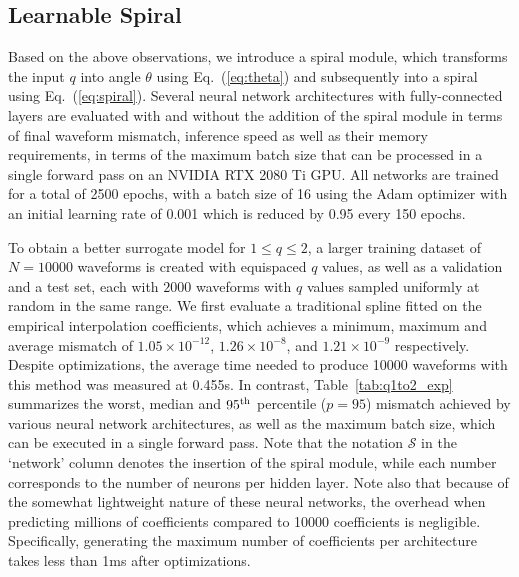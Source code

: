 \documentclass[preprint,12pt]{elsarticle}
\begin{document}
\subsection{Learnable Spiral}

Based on the above observations, we introduce a spiral module, which transforms the input $q$ into angle $\theta$ using Eq.~(\ref{eq:theta}) and subsequently into a spiral using Eq.~(\ref{eq:spiral}). Several neural network architectures with fully-connected layers are evaluated with and without the addition of the spiral module in terms of final waveform mismatch, inference speed as well as their memory requirements, in terms of the maximum batch size that can be processed in a single forward pass on an NVIDIA RTX 2080 Ti GPU. All networks are trained for a total of 2500 epochs, with a batch size of 16 using the Adam optimizer \cite{kingma2014adam} with an initial learning rate of 0.001 which is reduced by 0.95 every 150 epochs.

To obtain a better surrogate model for $1\leq q\leq 2$, a larger training dataset of $N=10000$ waveforms is created with equispaced $q$ values, as well as a validation and a test set, each with $2000$ waveforms with $q$ values sampled uniformly at random in the same range. We first evaluate a traditional spline fitted on the empirical interpolation coefficients, which achieves a minimum, maximum and average mismatch of $1.05 \times 10^{-12}$, $1.26 \times 10^{-8}$, and $1.21 \times 10^{-9}$ respectively.
Despite optimizations, the average time needed to produce 10000 waveforms with this method was measured at 0.455s. In contrast, Table~\ref{tab:q1to2_exp} summarizes the worst, median and $95^{\rm th}$ percentile ($p=95$) mismatch achieved by various neural network architectures, as well as the maximum batch size, which can be executed in a single forward pass. Note that the notation $\mathcal{S}$ in the `network' column denotes the insertion of the spiral module, while each number corresponds to the number of neurons per hidden layer. Note also that because of the somewhat lightweight nature of these neural networks, the overhead when predicting millions of coefficients compared to 10000 coefficients is negligible. Specifically, generating the maximum number of coefficients per architecture takes less than 1ms after optimizations.
\end{document}
